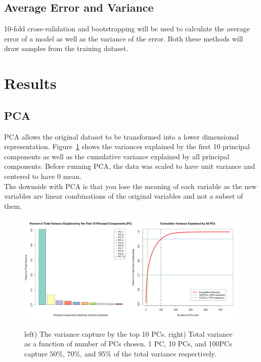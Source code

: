 \documentclass[paper=a4, fontsize=11pt]{scrartcl} %
\numberwithin{equation}{section} %
\numberwithin{figure}{section} %
\numberwithin{table}{section} %
\begin{document}
\subsection{Average Error and Variance}
10-fold cross-validation and bootstrapping will be used to calculate the
average error of a model as well as the variance of the error. Both these
methods will draw samples from the training dataset.

\section{Results}

\subsection{PCA}
PCA allows the original dataset to be transformed into a lower dimensional 
representation. Figure~\ref{fig:pca} shows the 
variances explained by the first 10 principal components as well as the
cumulative variance explained by all principal components. Before running 
PCA, the data was scaled to have unit variance and centered to have 0 mean.\\

The downside with PCA is that you lose the meaning of each variable as the new 
variables are linear combinations of the original variables and not a subset of them.

\begin{figure}[h!]
  \centering
    \includegraphics[width=\textwidth]{../figures/pca_v2}
  \label{fig:pca}
  \caption{ left) The variance capture by the top 10 PCs. right) Total
  variance as a function of number of PCs chosen. 1 PC, 10 PCs, and 100PCs capture $50\%$, $70\%$, and $95\%$ of the total variance 
  respectively.}
\end{figure}
\end{document}
